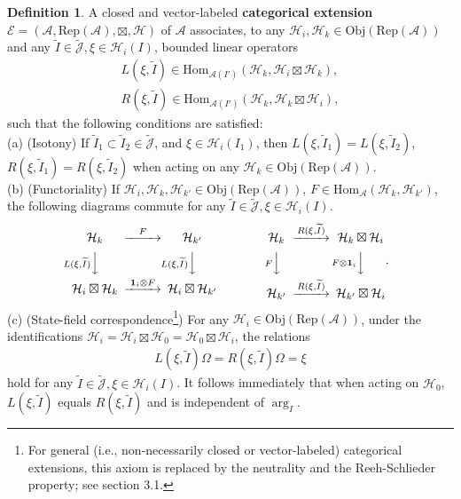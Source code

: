 \documentclass[12pt,a4paper]{article}
\theoremstyle{definition}
\newtheorem{df}{Definition}[subsection]
\theoremstyle{plain}
\newcommand{\fk}{\mathfrak}
\newcommand{\mc}{\mathcal}
\newcommand{\wtd}{\widetilde}
\newcommand{\id}{\mathbf{1}}
\newcommand{\Hom}{\mathrm{Hom}}
\newcommand{\scr}{\mathscr}
\newcommand{\Jtd}{\widetilde{\mathcal J}}
\newcommand{\RepA}{\mathrm{Rep}(\mc A)}
\newcommand{\Obj}{\mathrm{Obj}}
\numberwithin{equation}{subsection}
\begin{document}
\begin{df}
	A closed and  vector-labeled \textbf{categorical extension} $\scr E=(\mc A,\RepA,\boxtimes,\mc H)$ of $\mc A$ associates, to any  $\mc H_i,\mc H_k\in\Obj(\RepA)$ and any $\wtd I\in\Jtd,\fk \xi\in\mc H_i(I)$, bounded linear operators
	\begin{gather*}
	L(\xi,\wtd I)\in\Hom_{\mc A(I')}(\mc H_k,\mc H_i\boxtimes\mc H_k),\\
	R(\xi,\wtd I)\in\Hom_{\mc A(I')}(\mc H_k,\mc H_k\boxtimes\mc H_i),
	\end{gather*}
	such that the following conditions are satisfied:\\
	(a) (Isotony) If $\wtd I_1\subset\wtd I_2\in\Jtd$, and $\xi\in\mc H_i(I_1)$, then $L(\xi,\wtd I_1)=L(\xi,\wtd I_2)$, $R(\xi,\wtd I_1)=R(\xi,\wtd I_2)$ when acting on any  $\mc H_k\in\Obj(\RepA)$.\\
	(b) (Functoriality) If $\mc H_{i},\mc H_k,\mc H_{k'}\in\Obj(\RepA)$, $F\in\Hom_{\mc A}(\mc H_k,\mc H_{k'})$,  the following diagrams commute for any $\wtd I\in\Jtd,\xi\in\mc H_i(I)$.
	\begin{gather}
	\begin{CD}
	\mc H_k @>F>> \mc H_{k'}\\
	@V L(\xi,\wtd I)  VV @V L(\xi,\wtd I)  VV\\
	\mc H_i\boxtimes\mc H_k @> \id_i\otimes F>> \mc H_i\boxtimes\mc H_{k'}
	\end{CD}\qquad\qquad
	\begin{CD}
	\mc H_k @> R(\xi,\wtd I)  >> \mc H_k\boxtimes\mc H_i\\
	@V F VV @V F\otimes\id_i  VV\\
	\mc H_{k'} @>R(\xi,\wtd I) >> \mc H_{k'}\boxtimes\mc H_i
	\end{CD}.
	\end{gather}
	(c) (State-field correspondence\footnote{For general (i.e., non-necessarily closed or vector-labeled) categorical extensions, this axiom is replaced by the neutrality and the Reeh-Schlieder property; see \cite{Gui21a} section 3.1.}) For any $\mc H_i\in\Obj(\RepA)$, under the identifications $\mc H_i=\mc H_i\boxtimes\mc H_0=\mc H_0\boxtimes\mc H_i$, the relations
	\begin{align}
	L(\xi,\wtd I)\Omega=R(\xi,\wtd I)\Omega=\xi
	\end{align}
	hold for any $\wtd I\in\Jtd,\xi\in\mc H_i(I)$. It follows immediately that when acting on $\mc H_0$, $L(\xi,\wtd I)$ equals $R(\xi,\wtd I)$ and is independent of $\arg_I$.\\

\end{df}
\end{document}
